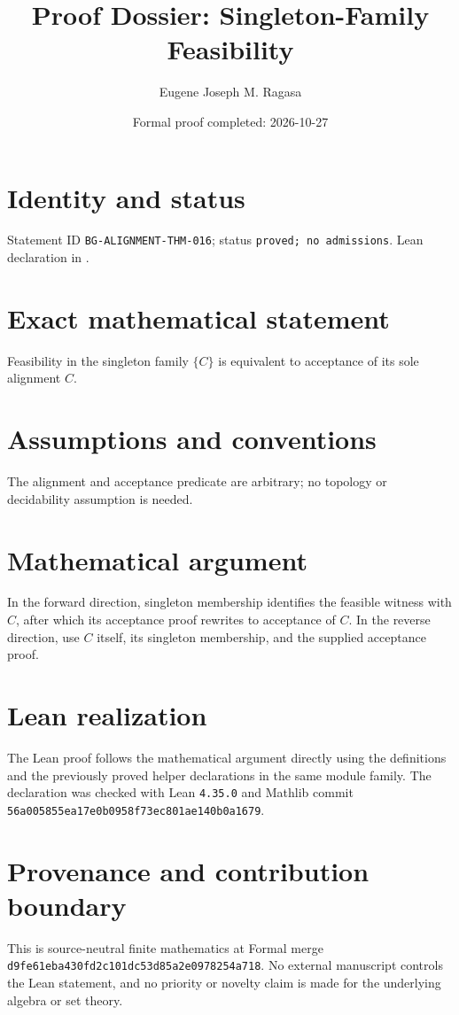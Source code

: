 \documentclass[11pt]{article}
\title{Proof Dossier: Singleton-Family Feasibility}
\author{Eugene Joseph M. Ragasa}
\date{Formal proof completed: 2026-10-27}
\begin{document}
\raggedright
\maketitle

\section{Identity and status}
Statement ID \texttt{BG-ALIGNMENT-THM-016}; status \texttt{proved; no admissions}.  Lean declaration
 in
.

\section{Exact mathematical statement}
Feasibility in the singleton family $\{C\}$ is equivalent to acceptance of its sole alignment $C$.

\section{Assumptions and conventions}
The alignment and acceptance predicate are arbitrary; no topology or decidability assumption is needed.

\section{Mathematical argument}
In the forward direction, singleton membership identifies the feasible witness with $C$, after which its acceptance proof rewrites to acceptance of $C$.  In the reverse direction, use $C$ itself, its singleton membership, and the supplied acceptance proof.

\section{Lean realization}
The Lean proof follows the mathematical argument directly using the definitions and the
previously proved helper declarations in the same module family.  The declaration was checked
with Lean \texttt{4.35.0} and Mathlib commit \texttt{56a005855ea17e0b0958f73ec801ae140b0a1679}.

\section{Provenance and contribution boundary}
This is source-neutral finite mathematics at Formal merge
\texttt{d9fe61eba430fd2c101dc53d85a2e0978254a718}.  No external manuscript controls the Lean statement, and no priority or
novelty claim is made for the underlying algebra or set theory.
\end{document}
